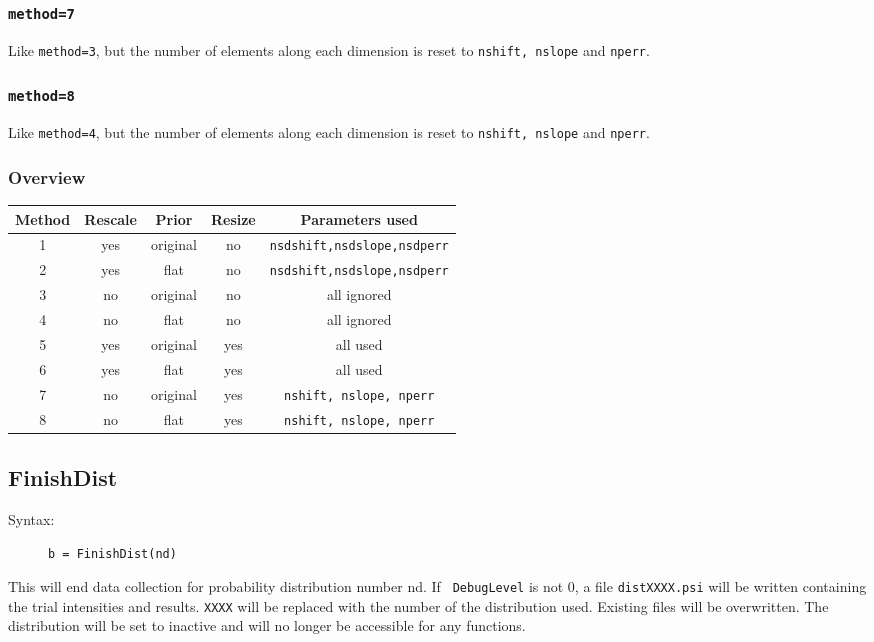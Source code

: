 \documentclass[10pt,letterpaper]{article}
\begin{document}
\subsubsection{\tt method=7}

Like {\tt method=3}, but the number of elements along each dimension is reset to 
{\tt nshift, nslope} and {\tt nperr}.

\subsubsection{\tt method=8}

Like {\tt method=4}, but the number of elements along each dimension is reset to 
{\tt nshift, nslope} and {\tt nperr}.

\subsubsection{Overview}

\begin{tabular}{|c||c|c|c|c|} \hline
Method & Rescale & Prior & Resize & Parameters used \\ \hline \hline
1 & yes & original & no & {\tt nsdshift,nsdslope,nsdperr} \\ \hline
2 & yes & flat & no & {\tt nsdshift,nsdslope,nsdperr} \\ \hline
3 & no & original & no & all ignored \\ \hline
4 & no & flat & no & all ignored \\ \hline
5 & yes & original & yes & all used \\ \hline
6 & yes & flat & yes & all used \\ \hline
7 & no & original & yes & {\tt nshift, nslope, nperr} \\ \hline
8 & no & flat & yes & {\tt nshift, nslope, nperr} \\ \hline
\end{tabular}

\subsection{FinishDist}

\begin{description}
\item[Syntax:] {\tt b = FinishDist(nd)}
\end{description}

This will end data collection for probability distribution number nd. If {\tt 
DebugLevel} is not 0, a file {\tt distXXXX.psi} will be written containing the 
trial intensities and results. {\tt XXXX} will be replaced with the number of 
the distribution used. Existing files will be overwritten. The distribution will 
be set to inactive and will no longer be accessible for any functions.
\end{document}
